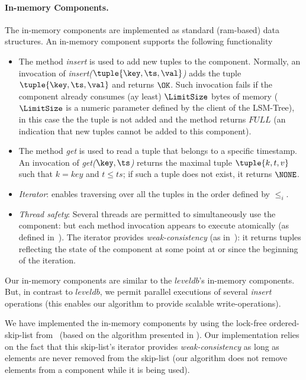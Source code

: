 \paragraph{In-memory Components.}
The in-memory components are implemented as standard (ram-based) data structures.
An in-memory component supports the following functionality
\begin{itemize}
  \item The method \emph{insert} is used to add new tuples to the component.
  Normally, an invocation of \emph{insert($\tuple{\key,\ts,\val}$)} adds the tuple $\tuple{\key,\ts,\val}$ and returns $\OK$.
  Such invocation fails if the component already consumes (ay least) $\LimitSize$ bytes of memory
  ($\LimitSize$ is a numeric parameter defined by the client of the LSM-Tree),
  in this case the the tuple is not added and the method returns $FULL$ (an indication that new tuples cannot be added to this component).
  \item The method \emph{get} is used to read a tuple that belongs to a specific timestamp.
  An invocation of \emph{get($\key,\ts$)} returns the maximal tuple $\tuple{k,t,v}$ such that $k=key$ and $t \leq ts$;
  if such a tuple does not exist, it returns $\NONE$.
  \item \emph{Iterator}: enables traversing over all the tuples in the order defined by $\leq_i$.
  \item \emph{Thread safety}:
  Several threads are permitted to simultaneously use the component:
  but each method invocation appears to execute atomically (as defined in~\cite{xxxx}).
  The iterator provides \emph{weak-consistency} (as in~\cite{xxx}):
  it returns tuples reflecting the state of the component at some point at or since the beginning of the iteration.
\end{itemize}

Our in-memory components are similar to the $leveldb$'s in-memory components.
But, in contrast to $leveldb$, we permit parallel executions of several \emph{insert} operations
(this enables our algorithm to provide scalable write-operations).

We have implemented the in-memory components by using the lock-free ordered-skip-list from~\cite{xxxx}
(based on the algorithm presented in \cite{xxx}).
Our implementation relies on the fact that this skip-list's iterator provides \emph{weak-consistency} as long as elements are never removed from the skip-list
(our algorithm does not remove elements from a component while it is being used).

